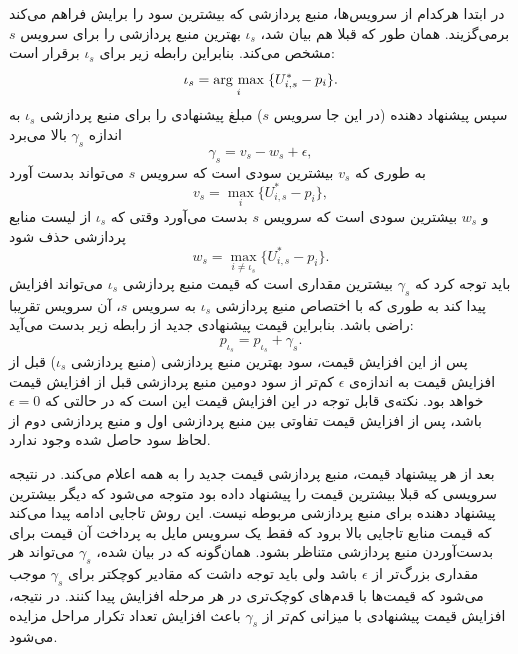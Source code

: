       در ابتدا هرکدام از سرویس‌ها، منبع پردازشی که بیشترین سود را برایش فراهم می‌کند برمی‌گزیند.
      همان طور که قبلا هم بیان شد، $\iota_s$ بهترین منبع پردازشی را برای سرویس $s$ مشخص می‌کند.
      بنابراین رابطه زیر برای $\iota_s$ برقرار است:
      \begin{equation}\label{eqn:argmax_benefit}
        \iota_s = \underset{i}{\operatorname{arg}\,\operatorname{max}}\;\{U_{i,s}^* - p_i\}.
      \end{equation}
      سپس پیشنهاد دهنده (در این جا سرویس $s$) مبلغ پیشنهادی را برای منبع پردازشی $\iota_s$ به اندازه $\gamma_s$ بالا می‌برد
      \begin{equation}\label{eqn:bid_increase_1}
        \gamma_s = v_s - w_s + \epsilon,
      \end{equation}
      به طوری که $v_s$ بیشترین سودی است که سرویس $s$ می‌تواند بدست آورد
      \begin{equation}\label{eqn:bid_increase_2}
        v_s = \max_i\{U_{i,s}^* - p_i\},
      \end{equation}
      و $w_s$ بیشترین سودی است که سرویس $s$ بدست می‌آورد وقتی که $\iota_s$ از لیست منابع پردازشی حذف شود
      \begin{equation}\label{eqn:bid_increase_3}
        w_s = \max_{i \ne \iota_s}\{U_{i,s}^* - p_i\}.
      \end{equation}
      باید توجه کرد که $\gamma_s$ بیشترین مقداری است که قیمت منبع پردازشی $\iota_s$ می‌تواند افزایش پیدا کند به طوری که با اختصاص منبع پردازشی $\iota_s$ به سرویس $s$، آن سرویس تقریبا راضی باشد.
      بنابراین قیمت پیشنهادی جدید از رابطه زیر بدست می‌آید:
      \begin{equation}\label{eqn:bid_increase_4}
        p_{\iota_s} = p_{\iota_s} + \gamma_s.
      \end{equation}
      پس از این افزایش قیمت، سود بهترین منبع پردازشی (منبع پردازشی $\iota_s$) قبل از افزایش قیمت به اندازه‌ی $\epsilon$ کم‌تر از سود دومین منبع پردازشی قبل از افزایش قیمت خواهد بود.
      نکته‌ی قابل توجه در این افزایش قیمت این است که در حالتی که $\epsilon = 0$ باشد، پس از افزایش قیمت تفاوتی بین منبع پردازشی اول و منبع پردازشی دوم از لحاظ سود حاصل شده وجود ندارد.

      بعد از هر پیشنهاد قیمت، منبع پردازشی قیمت جدید را به همه اعلام می‌کند.
      در نتیجه سرویسی که قبلا بیشترین قیمت را پیشنهاد داده بود متوجه می‌شود که دیگر بیشترین پیشنهاد دهنده برای منبع پردازشی مربوطه نیست.
      این روش تاجایی ادامه پیدا می‌کند که قیمت منابع تاجایی بالا برود که فقط یک سرویس مایل به پرداخت آن قیمت برای بدست‌آوردن منبع پردازشی متناظر بشود.
      همان‌گونه که در \cite{auction_algorithms_bertsekas} بیان شده، $\gamma_s$ می‌تواند هر مقداری بزرگ‌تر از $\epsilon$ باشد ولی باید توجه داشت که مقادیر کوچکتر برای $\gamma_s$ موجب می‌شود که قیمت‌ها با قدم‌های کوچک‌تری در هر مرحله افزایش پیدا کنند.
      در نتیجه، افزایش قیمت پیشنهادی با میزانی کم‌تر از $\gamma_s$ باعث افزایش تعداد تکرار مراحل مزایده می‌شود.

